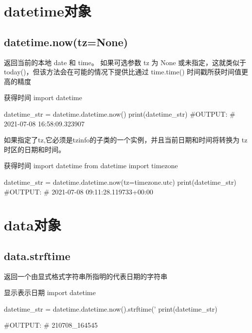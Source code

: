 \documentclass[11pt]{article}
\begin{document}
\section{datetime对象}
\subsection{datetime.now(tz=None)}
返回当前的本地 date 和 time。 如果可选参数 tz 为 None 或未指定，这就类似于 today()，但该方法会在可能的情况下提供比通过 time.time() 时间戳所获时间值更高的精度
\begin{Python}{获得时间}
import datetime

datetime_str = datetime.datetime.now()
print(datetime_str)
#OUTPUT:
#       2021-07-08 16:58:09.323907
\end{Python}
如果指定了tz,它必须是tzinfo的子类的一个实例，并且当前日期和时间将转换为 tz 时区的日期和时间。
\begin{Python}{获得时间}
import datetime
from datetime import timezone

datetime_str = datetime.datetime.now(tz=timezone.utc)
print(datetime_str)
#OUTPUT:
#       2021-07-08 09:11:28.119733+00:00
\end{Python}
\section{data对象}
\subsection{data.strftime}
返回一个由显式格式字符串所指明的代表日期的字符串
\begin{Python}{显示表示日期}
import datetime

datetime_str = datetime.datetime.now().strftime('%
print(datetime_str)

#OUTPUT:
#		210708_164545
\end{Python}
\end{document}
